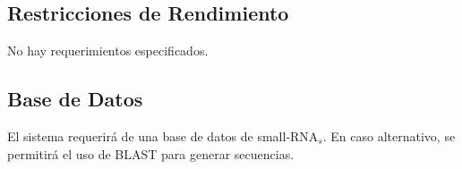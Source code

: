 \documentclass[12pt,a4paper,english,spanish]{article}
\begin{document}
\begin{itemize}



	\end{itemize}


\subsection{Restricciones de Rendimiento}
No hay requerimientos especificados.

\subsection{Base de Datos}
	\par El sistema requerirá de una base de datos de small-RNA$_s$. En caso alternativo, se permitirá el uso de BLAST para generar secuencias. 
\end{document}
